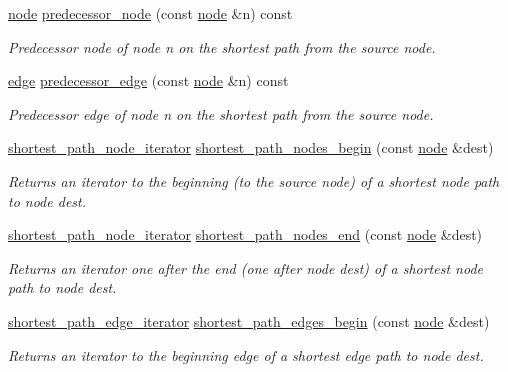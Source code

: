 \begin{DoxyCompactItemize}
\mbox{\hyperlink{classnode}{node}} \mbox{\hyperlink{classdijkstra_a99c17ee7c2b55574ea8c2952fac09faf}{predecessor\+\_\+node}} (const \mbox{\hyperlink{classnode}{node}} \&n) const
\begin{DoxyCompactList}\small\item\em Predecessor node of node {\ttfamily n} on the shortest path from the source node. \end{DoxyCompactList}\item 
\mbox{\hyperlink{classedge}{edge}} \mbox{\hyperlink{classdijkstra_aa3ef1a7d7dfc33e4a39aff309f873929}{predecessor\+\_\+edge}} (const \mbox{\hyperlink{classnode}{node}} \&n) const
\begin{DoxyCompactList}\small\item\em Predecessor edge of node {\ttfamily n} on the shortest path from the source node. \end{DoxyCompactList}\item 
\mbox{\hyperlink{classdijkstra_a5062e9a8339848666efcf2143c4c1881}{shortest\+\_\+path\+\_\+node\+\_\+iterator}} \mbox{\hyperlink{classdijkstra_ae30c66319d925387ed858aab9ce419ae}{shortest\+\_\+path\+\_\+nodes\+\_\+begin}} (const \mbox{\hyperlink{classnode}{node}} \&dest)
\begin{DoxyCompactList}\small\item\em Returns an iterator to the beginning (to the source node) of a shortest node path to node {\ttfamily dest}. \end{DoxyCompactList}\item 
\mbox{\hyperlink{classdijkstra_a5062e9a8339848666efcf2143c4c1881}{shortest\+\_\+path\+\_\+node\+\_\+iterator}} \mbox{\hyperlink{classdijkstra_ae9846beeabd53a8cf0c0c1af328235b2}{shortest\+\_\+path\+\_\+nodes\+\_\+end}} (const \mbox{\hyperlink{classnode}{node}} \&dest)
\begin{DoxyCompactList}\small\item\em Returns an iterator one after the end (one after node {\ttfamily dest}) of a shortest node path to node {\ttfamily dest}. \end{DoxyCompactList}\item 
\mbox{\hyperlink{classdijkstra_ad35d95d4ed7a4202a5d048a63aa115b9}{shortest\+\_\+path\+\_\+edge\+\_\+iterator}} \mbox{\hyperlink{classdijkstra_ad7ef6f747b68f8951322b265844dbb8a}{shortest\+\_\+path\+\_\+edges\+\_\+begin}} (const \mbox{\hyperlink{classnode}{node}} \&dest)
\begin{DoxyCompactList}\small\item\em Returns an iterator to the beginning edge of a shortest edge path to node {\ttfamily dest}. \end{DoxyCompactList}\item 

\end{DoxyCompactItemize}
